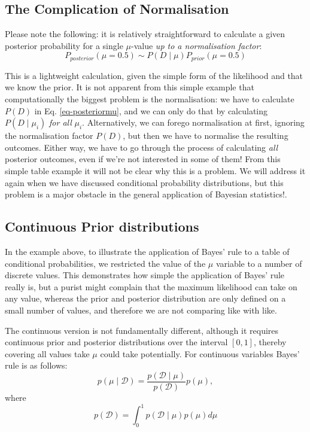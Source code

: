 \subsection{The Complication of Normalisation}

Please note the following: it is relatively straightforward to calculate a given posterior probability for a single $\mu$-value \emph{up to a normalisation factor}:
$$
P_{posterior}(\mu = 0.5) \sim P( D \mid \mu)P_{prior}(\mu = 0.5)
$$

This is a lightweight calculation, given the simple form of the likelihood and that we know the prior. It is not apparent from this simple example that computationally the
biggest problem is the normalisation: we have to calculate $P(D)$ in Eq. \ref{eq-posteriormu}, and we can only do that by calculating $P(D \mid \mu_i)$ \emph{for all}
$\mu_i$. Alternatively, we can forego normalisation at first, ignoring the normalisation factor $P( D )$, but then we have to normalise the resulting outcomes. Either way,
we have to go through the process of calculating \emph{all} posterior outcomes, even if we're not interested in some of them! From this simple table example it will not
be clear why this is a problem. We will address it again when we have discussed conditional probability distributions, but this problem is a major obstacle
in the general application of Bayesian statistics!.





\subsection{Continuous Prior distributions}


In the example above, to illustrate the application of Bayes' rule to a table of conditional probabilities, we restricted the value of the $\mu$ variable to a number of discrete values. This demonstrates how simple the application of Bayes' rule really is, but a purist might complain that the maximum likelihood can take on any value, whereas the prior and posterior distribution are only defined on a small number of values, and therefore
we are not comparing like with like.

The continuous version is not fundamentally different, although it requires continuous prior and posterior
distributions over the interval $[0,1]$, thereby covering all values take $\mu$ could take potentially.
For continuous variables Bayes' rule is as follows:
$$
p(\mu \mid \mathcal{D} ) = \frac{p(\mathcal{D} \mid \mu)} {p(\mathcal{D})} p(\mu),
$$
where
$$
p(\mathcal{D}) = \int^1_0 p(\mathcal{D} \mid \mu )p(\mu) d \mu
$$


